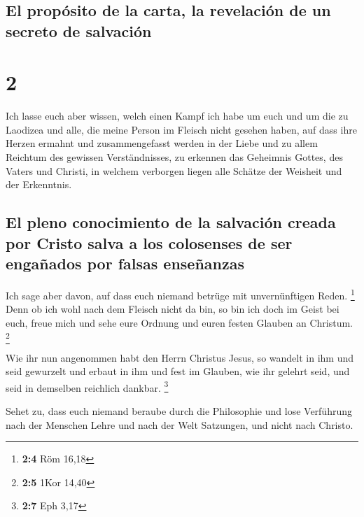 \hypertarget{el-propuxf3sito-de-la-carta-la-revelaciuxf3n-de-un-secreto-de-salvaciuxf3n}{%
\subsection{El propósito de la carta, la revelación de un secreto de
salvación}\label{el-propuxf3sito-de-la-carta-la-revelaciuxf3n-de-un-secreto-de-salvaciuxf3n}}

\hypertarget{section-1}{%
\section{2}\label{section-1}}

 Ich lasse euch aber wissen, welch einen Kampf ich habe um
euch und um die zu Laodizea und alle, die meine Person im Fleisch nicht
gesehen haben,  auf dass ihre Herzen ermahnt und
zusammengefasst werden in der Liebe und zu allem Reichtum des gewissen
Verständnisses, zu erkennen das Geheimnis Gottes, des Vaters und
Christi,  in welchem verborgen liegen alle Schätze der
Weisheit und der Erkenntnis.

\hypertarget{el-pleno-conocimiento-de-la-salvaciuxf3n-creada-por-cristo-salva-a-los-colosenses-de-ser-engauxf1ados-por-falsas-enseuxf1anzas}{%
\subsection{El pleno conocimiento de la salvación creada por Cristo
salva a los colosenses de ser engañados por falsas
enseñanzas}\label{el-pleno-conocimiento-de-la-salvaciuxf3n-creada-por-cristo-salva-a-los-colosenses-de-ser-engauxf1ados-por-falsas-enseuxf1anzas}}

 Ich sage aber davon, auf dass euch niemand betrüge mit
unvernünftigen Reden. \footnote{\textbf{2:4} Röm 16,18} 
Denn ob ich wohl nach dem Fleisch nicht da bin, so bin ich doch im Geist
bei euch, freue mich und sehe eure Ordnung und euren festen Glauben an
Christum. \footnote{\textbf{2:5} 1Kor 14,40}

 Wie ihr nun angenommen habt den Herrn Christus Jesus, so
wandelt in ihm  und seid gewurzelt und erbaut in ihm und
fest im Glauben, wie ihr gelehrt seid, und seid in demselben reichlich
dankbar. \footnote{\textbf{2:7} Eph 3,17}

 Sehet zu, dass euch niemand beraube durch die Philosophie
und lose Verführung nach der Menschen Lehre und nach der Welt Satzungen,
und nicht nach Christo.

